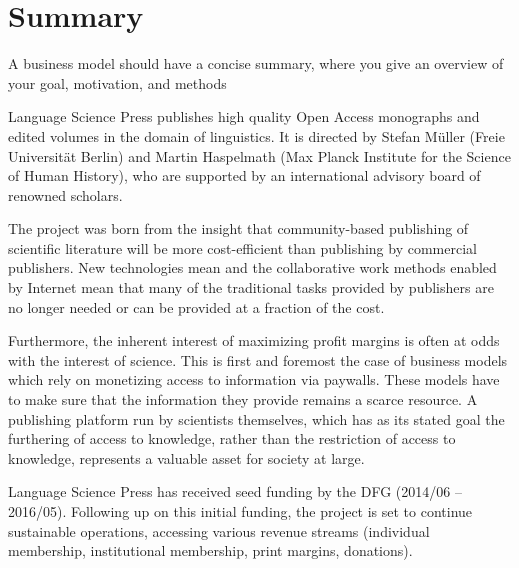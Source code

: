 \documentclass[output=guidelines,nonflat,smallfont,
draftmode
]{langsci/langscibook}
\newcommand{\background}[1]{ 
  \vspace{5mm}
  \renewcommand{\tblslinecolour}{lsDarkBlue}
  \tblssy[red]{explore2}{Background}{\vspace*{-5mm}#1}
}
\newcommand{\langscisolution}[1]{
  \renewcommand{\tblslinecolour}{lsLightBlue}
  \tblssy{langsci}{LangSci solution}{\vspace*{-5mm}#1}
}
\renewcommand{\tblssy}[4][black!12]{%
  \renewcommand{\langscisymbol}{#2}\renewcommand{\tblsboxcolor}{#1}
  \begin{mdframed}[style=yellowexercise,frametitle={#3}]
    #4
  \end{mdframed}
}
\begin{document}
\chapter{Summary} 
\background{ 
A business model should have a concise summary, where you give an overview of your goal, motivation, and methods
}
\langscisolution{ 
Language Science Press publishes high quality Open Access monographs and edited volumes in the domain of linguistics. It is directed by Stefan Müller (Freie Universität Berlin) and Martin Haspelmath (Max Planck Institute for the Science of Human History), who are supported by an international advisory board of renowned scholars.

The project was born from the insight that community-based publishing of scientific literature will be more cost-efficient than publishing by commercial publishers. New technologies mean and the collaborative work methods enabled by Internet mean that many of the traditional tasks provided by publishers are no longer needed or can be provided at a fraction of the cost. 

Furthermore, the inherent interest of maximizing profit margins is often at odds with the interest of science. This is first and foremost the case of business models which rely on monetizing access to information via paywalls. These models have to make sure that the information they provide remains a scarce resource. A publishing platform run by scientists themselves, which has as its stated goal the furthering of access to knowledge, rather than the restriction of access to knowledge, represents a valuable asset for society at large. 

Language Science Press has received seed funding by the DFG (2014/06 – 2016/05). Following up on this initial funding, the project is set to continue sustainable operations, accessing various revenue streams (individual membership, institutional membership, print margins, donations). 

}
\end{document}
